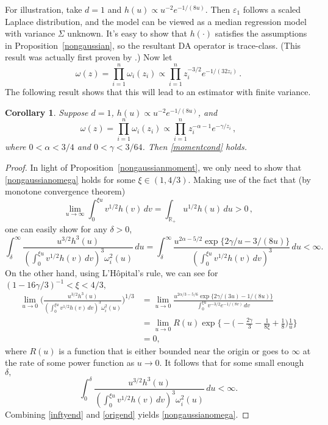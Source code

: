 \documentclass[11pt]{article}
\newtheorem{corollary}{Corollary}
\begin{document}
	For illustration, take $d=1$ and $h(u) \propto
        u^{-2}e^{-1/(8u)}$.  Then $\varepsilon_1$ follows a scaled
        Laplace distribution, and the model can be viewed as a median
        regression model with variance $\Sigma$ unknown.  It's easy to
        show that $h(\cdot)$ satisfies the assumptions in
        Proposition~\ref{nongaussian}, so the resultant DA operator is
        trace-class.  (This result was actually first proven by
        \cite{choi2013analysis}.)  Now let
	\[
	\omega(z) = \prod_{i=1}^{n} \omega_i(z_i) \propto
        \prod_{i=1}^{n} z_i^{-3/2} e^{-1/(32z_i)} \,.
	\]
        The following result shows that this will lead to an estimator
        with finite variance.
	\begin{corollary}
          Suppose $d=1$, $h(u) \propto u^{-2}e^{-1/(8u)}$, and 
          \[
          \omega(z) = \prod_{i=1}^{n} \omega_i(z_i) \propto
          \prod_{i=1}^{n} z_i^{-\alpha-1} e^{-\gamma/z_i} \,,
          \]
          where $0 < \alpha < 3/4$ and $0 < \gamma < 3/64$.  Then
          \eqref{momentcond} holds.
	\end{corollary}
	\begin{proof}
          In light of Proposition~\ref{nongaussianmoment}, we only
          need to show that \eqref{nongaussianomega} holds for some
          $\xi \in (1,4/3).$ Making use of the fact that (by monotone
          convergence theorem)
		\[
		\lim\limits_{u \to \infty} \int_{0}^{\xi u}
                v^{1/2}h(v) \, dv = \int_{\mathbb{R}_+} u^{1/2} h(u)
                \, du > 0 \,,
		\]
		one can easily show for any $\delta > 0$,
		\begin{equation} \label{inftyend}
		\int_{\delta}^{\infty} \frac{u^{3/2}h^3(u)} {(\int_{0}^{\xi u} v^{1/2}h(v) \, dv)^3 \omega_i^2(u) } \, du = \int_{\delta}^{\infty} \frac{u^{2\alpha-5/2}\exp\{ 2\gamma/u-3/(8u) \} } {(\int_{0}^{\xi u} v^{1/2}h(v) \, dv)^3} \, du < \infty.
		\end{equation}
		On the other hand, using L'H\^{o}pital's rule, we can see for $(1-16\gamma/3)^{-1} < \xi < 4/3,$
		\[
		\begin{aligned}
		\lim\limits_{u \to 0} \Bigg( \frac{u^{3/2}h^3(u)} {(\int_{0}^{\xi u} v^{1/2}h(v) \, dv)^3 \omega_i^2(u) } \Bigg)^{1/3} &= \lim\limits_{u \to 0} \frac{u^{2\alpha/3-5/6} \exp\{ 2\gamma/(3u)-1/(8u) \}}{ \int_{0}^{\xi u} v^{-3/2}e^{-1/(8v)}\, dv } \\
		&= \lim\limits_{u \to 0} R(u) \exp \Big\{ -\Big(-\frac{2\gamma}{3} - \frac{1}{8\xi} + \frac{1}{8} \Big)\frac{1}{u} \Big\} \\
		& = 0,
		\end{aligned}
		\]
		where $R(u)$ is a function that is either bounded near
                the origin or goes to $\infty$ at the rate of some
                power function as $u \to 0.$ It follows that for some
                small enough $\delta,$
		\begin{equation} \label{origend}
		\int_{0}^{\delta} \frac{u^{3/2}h^3(u)} {(\int_{0}^{\xi u} v^{1/2}h(v) \, dv)^3 \omega_i^2(u) } \, du < \infty.
		\end{equation}
		Combining \eqref{inftyend} and \eqref{origend} yields
                \eqref{nongaussianomega}.
	\end{proof}
	
\end{document}
